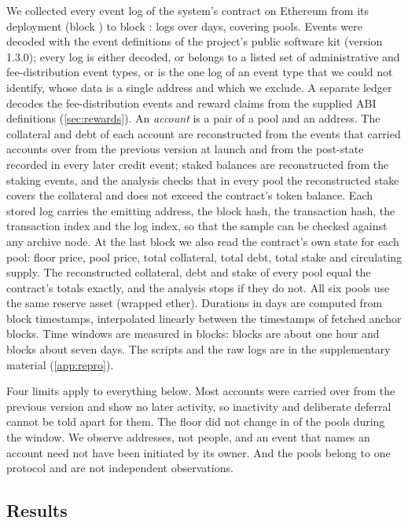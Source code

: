 We collected every event log of the system's contract on Ethereum from its deployment (block \EStartBlock) to block \EEndBlock: \ELogs{} logs over \EDays{} days, covering \EPools{} pools. Events were decoded with the event definitions of the project's public software kit (version 1.3.0); every log is either decoded, or belongs to a listed set of administrative and fee-distribution event types, or is the one log of an event type that we could not identify, whose data is a single address and which we exclude. A separate ledger decodes the fee-distribution events and reward claims from the supplied ABI definitions (\cref{sec:rewards}). An \emph{account} is a pair of a pool and an address. The collateral and debt of each account are reconstructed from the events that carried accounts over from the previous version at launch and from the post-state recorded in every later credit event; staked balances are reconstructed from the staking events, and the analysis checks that in every pool the reconstructed stake covers the collateral and does not exceed the contract's token balance. Each stored log carries the emitting address, the block hash, the transaction hash, the transaction index and the log index, so that the sample can be checked against any archive node. At the last block we also read the contract's own state for each pool: floor price, pool price, total collateral, total debt, total stake and circulating supply. The reconstructed collateral, debt and stake of every pool equal the contract's totals exactly, and the analysis stops if they do not. All six pools use the same reserve asset (wrapped ether). Durations in days are computed from block timestamps, interpolated linearly between the timestamps of fetched anchor blocks. Time windows are measured in blocks: \EHourBlocks{} blocks are about one hour and \EWeekBlocks{} blocks about seven days. The scripts and the raw logs are in the supplementary material (\cref{app:repro}).

Four limits apply to everything below. Most accounts were carried over from the previous version and show no later activity, so inactivity and deliberate deferral cannot be told apart for them. The floor did not change in \EFlatPools{} of the \EPools{} pools during the window. We observe addresses, not people, and an event that names an account need not have been initiated by its owner. And the pools belong to one protocol and are not independent observations.

\subsection{Results}

